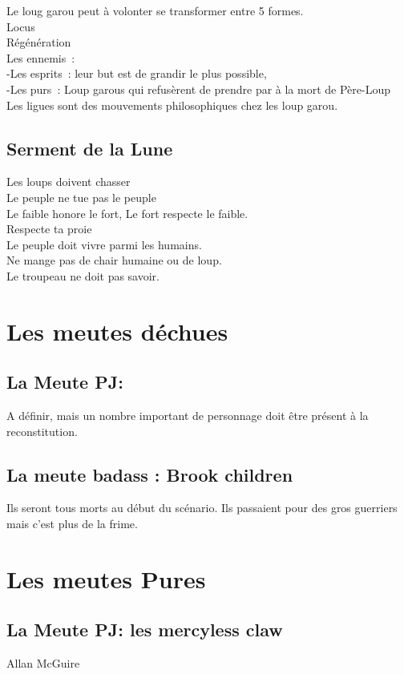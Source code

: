 \documentclass[oneside,12pt]{book}
\begin{document}
\begin{flushleft}
Le loug garou peut à volonter se transformer entre 5 formes.\\ 
Locus\\
Régénération\\
Les ennemis :\\
-Les esprits : leur but est de grandir le plus possible,\\ 
-Les purs : Loup garous qui refusèrent de prendre par à la mort de Père-Loup\\
Les ligues sont des mouvements philosophiques chez les loup garou.\\


\subsection{Serment de la Lune}
Les loups doivent chasser\\
Le peuple ne tue pas le peuple\\
Le faible honore le fort, Le fort respecte le faible.\\
Respecte ta proie\\
Le peuple doit vivre parmi les humains.\\
Ne mange pas de chair humaine ou de loup.\\
Le troupeau ne doit pas savoir.      \\


\section{Les meutes déchues}
\subsection{La Meute PJ: }
A définir, mais un nombre important de personnage doit être présent à la reconstitution. 

\subsection{La meute badass : Brook children}
Ils seront tous morts au début du scénario. Ils passaient pour des gros guerriers mais c'est plus de la frime.


\section{Les meutes Pures}
\subsection{La Meute PJ: les mercyless claw}
Allan McGuire \\



\end{flushleft}
\end{document}
